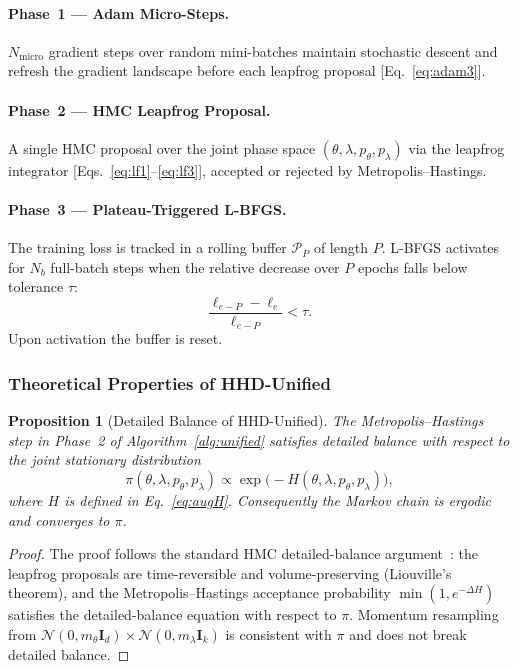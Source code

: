 \documentclass[11pt]{article}
\newtheorem{proposition}[theorem]{Proposition}
\theoremstyle{definition}
\newcommand{\calB}{\mathcal{P}}
\begin{document}
\paragraph{Phase~1 --- Adam Micro-Steps.}
$N_{\mathrm{micro}}$ gradient steps over random mini-batches maintain
stochastic descent and refresh the gradient landscape before each
leapfrog proposal [Eq.~\eqref{eq:adam3}].

\paragraph{Phase~2 --- HMC Leapfrog Proposal.}
A single HMC proposal over the joint phase space
$(\theta,\lambda,p_\theta,p_\lambda)$ via the leapfrog integrator
[Eqs.~\eqref{eq:lf1}--\eqref{eq:lf3}], accepted or rejected by
Metropolis--Hastings.

\paragraph{Phase~3 --- Plateau-Triggered L-BFGS.}
The training loss is tracked in a rolling buffer $\calB_P$ of length
$P$. L-BFGS activates for $N_b$ full-batch steps when the relative
decrease over $P$ epochs falls below tolerance $\tau$:
\begin{equation}
\frac{\ell_{e-P} - \ell_e}{\ell_{e-P}} < \tau.
\label{eq:plateau}
\end{equation}
Upon activation the buffer is reset.

\subsubsection{Theoretical Properties of HHD-Unified}

\begin{proposition}[Detailed Balance of HHD-Unified]
\label{prop:detailed_balance}
The Metropolis--Hastings step in Phase~2 of Algorithm~\ref{alg:unified}
satisfies detailed balance with respect to the joint stationary
distribution
\[
  \pi(\theta,\lambda,p_\theta,p_\lambda)
  \propto \exp\bigl(-H(\theta,\lambda,p_\theta,p_\lambda)\bigr),
\]
where $H$ is defined in Eq.~\eqref{eq:augH}. Consequently the Markov
chain is ergodic and converges to $\pi$.
\end{proposition}
\begin{proof}
The proof follows the standard HMC detailed-balance
argument~\cite[Sec.~5.2]{neal2011}: the leapfrog proposals are
time-reversible and volume-preserving (Liouville's theorem), and the
Metropolis--Hastings acceptance probability $\min(1,e^{-\Delta H})$
satisfies the detailed-balance equation with respect to $\pi$.
Momentum resampling from
$\mathcal{N}(0,m_\theta\mathbf{I}_d)\times\mathcal{N}(0,m_\lambda\mathbf{I}_k)$
is consistent with $\pi$ and does not break detailed balance.
\end{proof}
\end{document}

